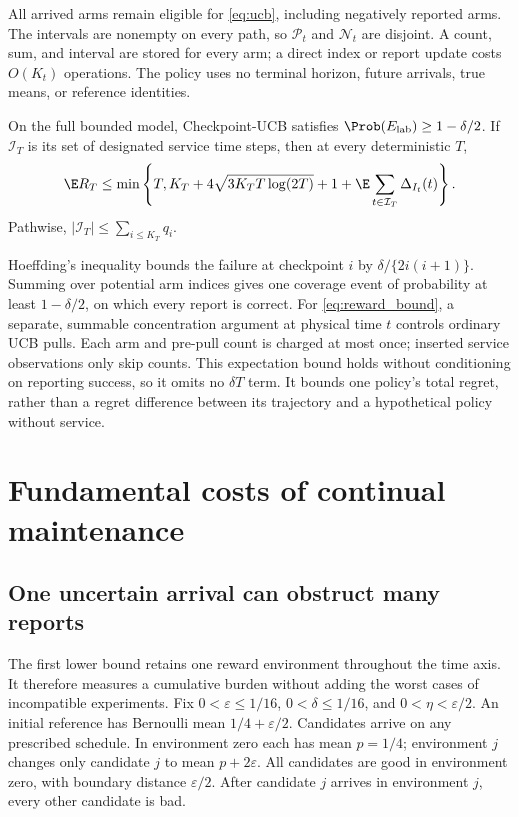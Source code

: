 All arrived arms remain eligible for \eqref{eq:ucb}, including negatively
reported arms. The intervals are nonempty on every path, so
$\mathcal P_t$ and $\mathcal N_t$ are disjoint. A count, sum, and interval
are stored for every arm; a direct index or report update costs $O(K_t)$
operations. The policy uses no terminal horizon, future arrivals, true means,
or reference identities.

\begin{proposition}
\label{prop:reporting}
On the full bounded model, Checkpoint-UCB satisfies
$\Prob(E_{\rm lab})\ge1-\delta/2$. If $\mathcal I_T$ is its set of designated
service time steps, then at every deterministic $T$,
\begin{equation}
 \E R_T\le\min\left\{T,K_T+4\sqrt{3K_TT\log(2T)}+1+
                \E\sum_{t\in\mathcal I_T}\Delta_{I_t}(t)\right\}.
 \label{eq:reward_bound}
\end{equation}
Pathwise, $|\mathcal I_T|\le\sum_{i\le K_T}q_i$.
\end{proposition}

Hoeffding's inequality bounds the failure at checkpoint $i$ by
$\delta/\{2i(i+1)\}$. Summing over potential arm indices gives one coverage
event of probability at least $1-\delta/2$, on which every report is correct.
For \eqref{eq:reward_bound}, a separate, summable concentration argument at
physical time $t$ controls ordinary UCB pulls. Each arm and pre-pull count
is charged at most once; inserted service observations only skip counts.
This expectation bound holds without conditioning on reporting success,
so it omits no $\delta T$ term. It bounds one policy's total regret, rather
than a regret difference between its trajectory and a hypothetical policy
without service. \suppproof

\section{Fundamental costs of continual maintenance}
\label{sec:maintenance}

\subsection{One uncertain arrival can obstruct many reports}

The first lower bound retains one reward environment throughout the time axis.
It therefore measures a cumulative burden without adding the worst cases of
incompatible experiments. Fix
$0<\varepsilon\le1/16$, $0<\delta\le1/16$, and $0<\eta<\varepsilon/2$.
An initial reference has Bernoulli mean $1/4+\varepsilon/2$. Candidates arrive
on any prescribed schedule. In environment zero each has mean $p=1/4$;
environment $j$ changes only candidate $j$ to mean $p+2\varepsilon$.
All candidates are good in environment zero, with boundary distance
$\varepsilon/2$. After candidate $j$ arrives in environment $j$, every other
candidate is bad.


